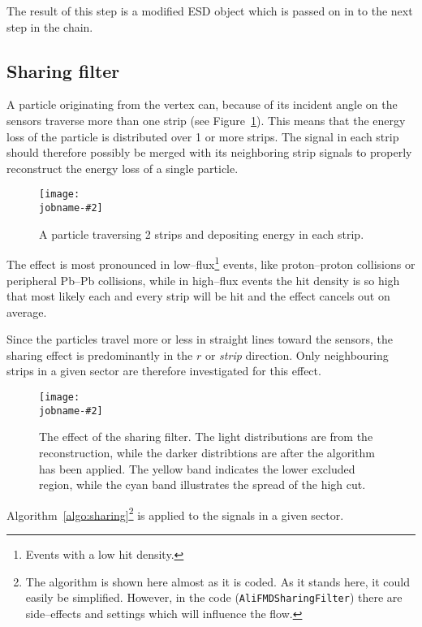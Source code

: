 \documentclass[compat,11pt]{alicenote}
\DeclareRobustCommand{\AlwaysText}[1]{\ifmmode\relax\text{#1}\else #1\fi}
\newcommand*\ESD{\AlwaysText{ESD}}
\newcommand{\figref}[1]{Figure~\ref{#1}}
\newcommand\figinput[2][\textwidth]{%
  \texttt{[image: \\jobname-\#2]}}
\begin{document}
The result of this step is a modified \ESD{} object which is passed on
in to the next step in the chain. 


\subsection{Sharing filter}
\label{sec:sub:sharing_filter}

A particle originating from the vertex can, because of its incident
angle on the \FMD{} sensors traverse more than one strip (see
\figref{fig:share_fraction}).  This means that the energy loss of the
particle is distributed over 1 or more strips.  The signal in each
strip should therefore possibly be merged with its neighboring strip
signals to properly reconstruct the energy loss of a single particle.

\begin{figure}[htbp]
  \centering
  \figinput[3cm]{share_fraction}
  \caption{A particle traversing 2 strips and depositing energy in
    each strip. }
  \label{fig:share_fraction}
\end{figure}

The effect is most pronounced in low--flux\footnote{Events with a low
  hit density.} events, like proton--proton collisions or peripheral
Pb--Pb collisions, while in high--flux events the hit density is so
high that most likely each and every strip will be hit and the effect
cancels out on average.

Since the particles travel more or less in straight lines toward the
\FMD{} sensors, the sharing effect is predominantly in the $r$ or
\emph{strip} direction.  Only neighbouring strips in a given sector are
therefore investigated for this effect.  

\begin{figure}[htbp]
  \centering
  \figinput[.8\linewidth]{sharing}
  \caption{The effect of the sharing filter.  The light distributions
    are from the reconstruction, while the darker distribtions are
    after the algorithm has been applied.  The yellow band indicates
    the lower excluded region, while the cyan band illustrates the
    spread of the high cut. }
  \label{fig:sharing:effect}
\end{figure}


Algorithm~\ref{algo:sharing}\footnote{The algorithm is shown here
  almost as it is coded.  As it stands here, it could easily be
  simplified.  However, in the code (\texttt{AliFMDSharingFilter})
  there are side--effects and settings which will influence the flow.}
is applied to the signals in a given sector.
\end{document}
